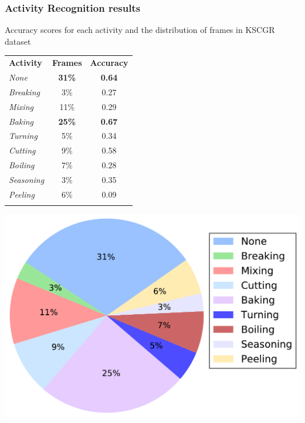 \documentclass{beamer}
\begin{document}
\begin{frame}[c]\frametitle{Activity Recognition results}
	 Accuracy scores for each activity and the distribution of frames in KSCGR dataset
	
	\begin{minipage}{0.48\linewidth}
        \begin{table}[tb!]
            \centering
            \footnotesize
            \begin{tabular}{l|cc} 
                \hline\noalign{\smallskip}
                \textbf{Activity} & \textbf{Frames} & \textbf{Accuracy} \\ 
                \noalign{\smallskip}\hline\hline\noalign{\smallskip}
                \textit{None}      & \textbf{31\%}  & \textbf{0.64}     \\ 
                \textit{Breaking}  &          3\%   &         0.27      \\
                \textit{Mixing}    &         11\%   &         0.29      \\
                \textit{Baking}    & \textbf{25\%}  & \textbf{0.67}     \\
                \textit{Turning}   &          5\%   &         0.34      \\
                \textit{Cutting}   &          9\%   &         0.58      \\
                \textit{Boiling}   &          7\%   &         0.28      \\
                \textit{Seasoning} &          3\%   &         0.35      \\
                \textit{Peeling}   &          6\%   &         0.09      \\
                \noalign{\smallskip}\hline
            \end{tabular}
        \end{table}
    \end{minipage}
    \begin{minipage}{0.48\linewidth}
        \includegraphics[width=\linewidth]{fig/perc.pdf}
    \end{minipage}
\end{frame}
\end{document}
